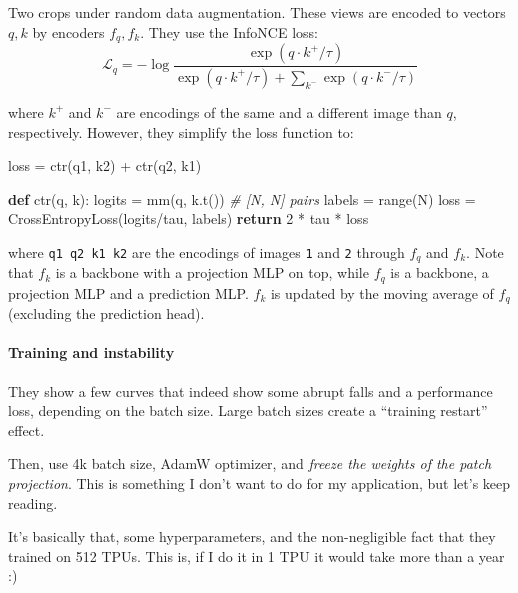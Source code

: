 \documentclass[
]{article}
\newenvironment{Shaded}{}{}
\newcommand{\BuiltInTok}[1]{#1}
\newcommand{\CommentTok}[1]{\textcolor[rgb]{0.38,0.63,0.69}{\textit{#1}}}
\newcommand{\ControlFlowTok}[1]{\textcolor[rgb]{0.00,0.44,0.13}{\textbf{#1}}}
\newcommand{\DecValTok}[1]{\textcolor[rgb]{0.25,0.63,0.44}{#1}}
\newcommand{\KeywordTok}[1]{\textcolor[rgb]{0.00,0.44,0.13}{\textbf{#1}}}
\newcommand{\NormalTok}[1]{#1}
\newcommand{\OperatorTok}[1]{\textcolor[rgb]{0.40,0.40,0.40}{#1}}
\begin{document}
Two crops under random data augmentation. These views are encoded to
vectors \(q, k\) by encoders \(f_q, f_k\). They use the InfoNCE loss:
\[\mathcal{L}_q = -\log{\frac{\exp{(q\cdot k^+ / \tau)}}{\exp{(q \cdot k^+ / \tau)}+\sum_{k^-}{\exp{(q \cdot k^- / \tau)}}}}\]

where \(k^+\) and \(k^-\) are encodings of the same and a different
image than \(q\), respectively. However, they simplify the loss function
to:

\begin{Shaded}
\begin{Highlighting}[]
\NormalTok{loss }\OperatorTok{=}\NormalTok{ ctr(q1, k2) }\OperatorTok{+}\NormalTok{ ctr(q2, k1)}

\KeywordTok{def}\NormalTok{ ctr(q, k):}
\NormalTok{    logits }\OperatorTok{=}\NormalTok{ mm(q, k.t())  }\CommentTok{\# [N, N] pairs}
\NormalTok{    labels }\OperatorTok{=} \BuiltInTok{range}\NormalTok{(N)}
\NormalTok{    loss }\OperatorTok{=}\NormalTok{ CrossEntropyLoss(logits}\OperatorTok{/}\NormalTok{tau, labels)}
    \ControlFlowTok{return} \DecValTok{2} \OperatorTok{*}\NormalTok{ tau }\OperatorTok{*}\NormalTok{ loss}
\end{Highlighting}
\end{Shaded}

where \texttt{q1\ q2\ k1\ k2} are the encodings of images \texttt{1} and
\texttt{2} through \(f_q\) and \(f_k\). Note that \(f_k\) is a backbone
with a projection MLP on top, while \(f_q\) is a backbone, a projection
MLP and a prediction MLP. \(f_k\) is updated by the moving average of
\(f_q\) (excluding the prediction head).

\hypertarget{training-and-instability}{%
\paragraph{Training and instability}\label{training-and-instability}}

They show a few curves that indeed show some abrupt falls and a
performance loss, depending on the batch size. Large batch sizes create
a ``training restart'' effect.

Then, use 4k batch size, AdamW optimizer, and \emph{freeze the weights
of the patch projection}. This is something I don't want to do for my
application, but let's keep reading.

It's basically that, some hyperparameters, and the non-negligible fact
that they trained on 512 TPUs. This is, if I do it in 1 TPU it would
take more than a year :)
\end{document}
